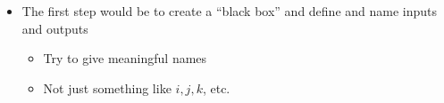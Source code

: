 \begin{itemize}
\begin{itemize}
\begin{enumerate}
        \end{enumerate}

    \end{itemize}

    \begin{itemize}

      \item The first step would be to create a ``black box'' and define and name inputs and outputs

        \begin{itemize}

          \item Try to give meaningful names

          \item Not just something like $i,j,k$, etc.

        \end{itemize}

    \end{itemize}

\end{itemize}




